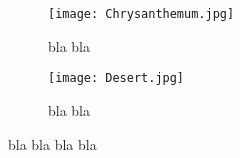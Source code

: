 \documentclass[11pt,a4paper]{article}
\author{}
\title{}
\date{}
\begin{document}
\maketitle

\begin{figure}[!tbp]
  \begin{subfigure}[b]{0.5\textwidth}
    \texttt{[image: Chrysanthemum.jpg]}
    \caption{bla bla} %
    \label{fig:f1}
  \end{subfigure}
  \hfill
  \begin{subfigure}[b]{0.5\textwidth}
    \texttt{[image: Desert.jpg]}
    \caption{bla bla} %
    \label{fig:f2}
  \end{subfigure}
  \caption{bla bla bla bla} %
\end{figure}
\end{document}
